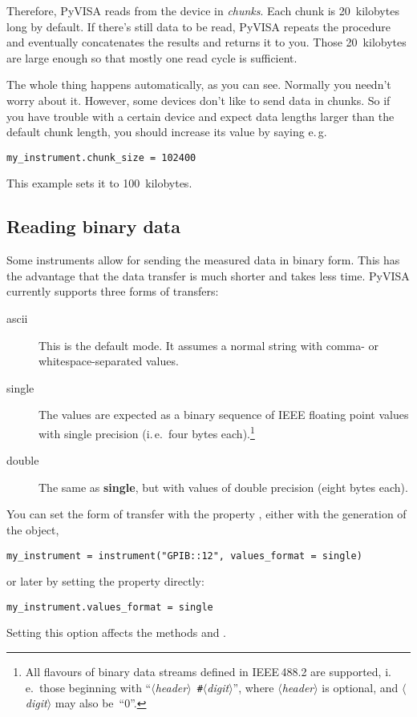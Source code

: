 \documentclass{howto}
\begin{document}
Therefore, PyVISA reads from the device in \emph{chunks}.  Each chunk is
20~kilobytes long by default.  If there's still data to be read, PyVISA repeats
the procedure and eventually concatenates the results and returns it to you.
Those 20~kilobytes are large enough so that mostly one read cycle is
sufficient.

The whole thing happens automatically, as you can see.  Normally you needn't
worry about it.  However, some devices don't like to send data in chunks.  So
if you have trouble with a certain device and expect data lengths larger than
the default chunk length, you should increase its value by saying e.\,g.
\begin{verbatim}
my_instrument.chunk_size = 102400
\end{verbatim}
This example sets it to 100~kilobytes.


\subsection{Reading binary data}
\label{sec:reading-binary-data}

Some instruments allow for sending the measured data in binary form.  This has
the advantage that the data transfer is much shorter and takes less time.
PyVISA currently supports three forms of transfers:

\begin{description}
\item[ascii] This is the default mode.  It assumes a normal string with comma-
  or whitespace-separated values.
\item[single] The values are expected as a binary sequence of IEEE floating
  point values with single precision (i.\,e.\ four bytes each).\footnote{All
    flavours of binary data streams defined in IEEE\,488.2 are supported,
    i.\,e.\ those beginning with
    ``\textit{$\langle$header$\rangle$}~\texttt{\#}\textit{$\langle$digit$\rangle$}'',
    where \textit{$\langle$header$\rangle$} is optional, and
    \textit{$\langle$digit$\rangle$} may also be~``0''.}
\item[double] The same as \textbf{single}, but with values of double precision
  (eight bytes each).
\end{description}

You can set the form of transfer with the property , either
with the generation of the object,
\begin{verbatim}
my_instrument = instrument("GPIB::12", values_format = single)
\end{verbatim}
or later by setting the property directly:
\begin{verbatim}
my_instrument.values_format = single
\end{verbatim}
Setting this option affects the methods  and
.
\end{document}
